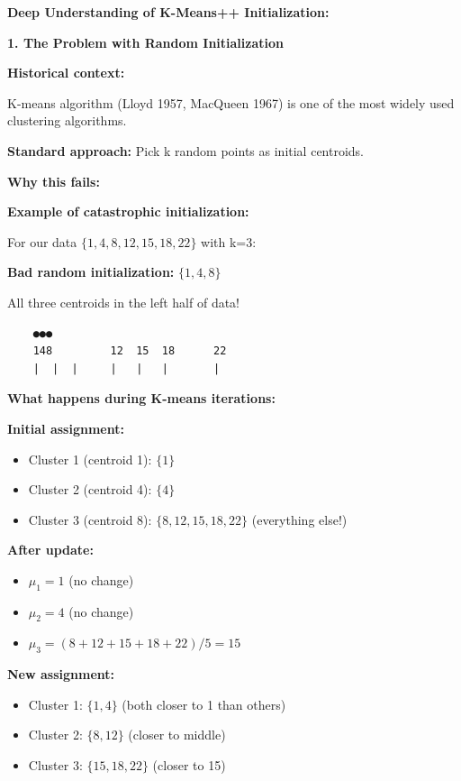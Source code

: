 \documentclass[12pt]{article}
\begin{document}
\begin{explanation}
\textbf{Deep Understanding of K-Means++ Initialization:}

\textbf{1. The Problem with Random Initialization}

\textbf{Historical context:}

K-means algorithm (Lloyd 1957, MacQueen 1967) is one of the most widely used clustering algorithms.

\textbf{Standard approach:} Pick k random points as initial centroids.

\textbf{Why this fails:}

\textbf{Example of catastrophic initialization:}

For our data $\{1, 4, 8, 12, 15, 18, 22\}$ with k=3:

\textbf{Bad random initialization:} $\{1, 4, 8\}$

All three centroids in the left half of data!

\begin{verbatim}
    ●●●
    148         12  15  18      22
    |  |  |     |   |   |       |
\end{verbatim}

\textbf{What happens during K-means iterations:}

\textbf{Initial assignment:}
\begin{itemize}
    \item Cluster 1 (centroid 1): $\{1\}$
    \item Cluster 2 (centroid 4): $\{4\}$
    \item Cluster 3 (centroid 8): $\{8, 12, 15, 18, 22\}$ (everything else!)
\end{itemize}

\textbf{After update:}
\begin{itemize}
    \item $\mu_1 = 1$ (no change)
    \item $\mu_2 = 4$ (no change)
    \item $\mu_3 = (8+12+15+18+22)/5 = 15$
\end{itemize}

\textbf{New assignment:}
\begin{itemize}
    \item Cluster 1: $\{1, 4\}$ (both closer to 1 than others)
    \item Cluster 2: $\{8, 12\}$ (closer to middle)
    \item Cluster 3: $\{15, 18, 22\}$ (closer to 15)
\end{itemize}


\end{explanation}
\end{document}
